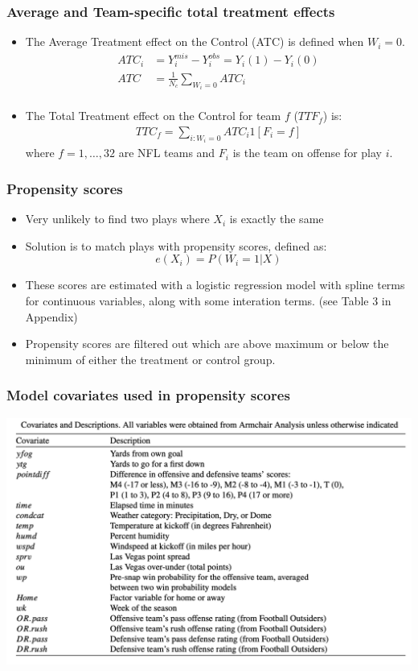 \documentclass[t]{beamer}
\begin{document}
\begin{frame}
  \frametitle{Average and Team-specific total treatment effects}
  \begin{itemize}
  \item The Average Treatment effect on the Control (ATC) is defined when $W_i = 0$. 
    \[
      \begin{split}
      ATC_i &= Y_i^{mis} - Y_i^{obs} = Y_i(1) - Y_i(0) \\
      ATC  &= \frac 1 {N_c} \sum_{W_i=0} ATC_i\\
    \end{split}
  \]
 \item The Total Treatment effect on the Control for team $f$ ($TTF_f$) is:
   \[
     \begin{split}
       TTC_f = \sum_{i: W_i = 0} ATC_i 1[F_i = f]
     \end{split}
   \]
   where $f = 1, \dots, 32$ are NFL teams and $F_i$ is the team on offense for play $i$.
  \end{itemize}
\end{frame}

\begin{frame}
  \frametitle{Propensity scores}
  \begin{itemize}
  \item Very unlikely to find two plays where $X_i$ is exactly the same
    \item Solution is to match plays with propensity scores, defined as:
      \[
        e(X_i) = P(W_i=1 | X)
      \]
    \item These scores are estimated with a logistic regression model with spline terms for continuous variables, along with some interation terms. (see Table 3 in Appendix)
    \item Propensity scores are filtered out which are above maximum or below the minimum of either the treatment or control group.
  \end{itemize}
\end{frame}

\begin{frame}
  \frametitle{Model covariates used in propensity scores}
  \centering \includegraphics[width=\linewidth]{./covariates.png}
\end{frame}
\end{document}
